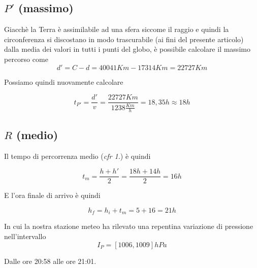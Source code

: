 \documentclass[12pt, a4paper]{article}
\begin{document}
\subsection{$P'$ (massimo)}

Giacchè la Terra è assimilabile ad una sfera siccome il raggio e quindi la circonferenza si discostano in modo trascurabile (ai fini del presente articolo) dalla media dei valori in tutti i punti del globo, è possibile calcolare il massimo percorso come 
$$
d'=C-d=40041Km-17314Km=22727Km
$$

Possiamo quindi nuovamente calcolare

$$
t_{P'}=\frac{d'}{v}=\frac{22727Km}{1238\frac{Km}{h}}=18,35h\approx18h
$$
\subsection{$R$ (medio)}

Il tempo di percorrenza medio (\emph{cfr 1.}) è quindi

$$
t_m=\frac{h+h'}2=\frac{18h+14h}2=16h
$$

E l'ora finale di arrivo è quindi

$$
h_f=h_i+t_m=5+16=21h
$$


In cui la nostra stazione meteo ha rilevato una repentina variazione di pressione nell'intervallo
$$
I_P=[1006,1009]hPa
$$

Dalle ore 20:58 alle ore 21:01.
\end{document}

